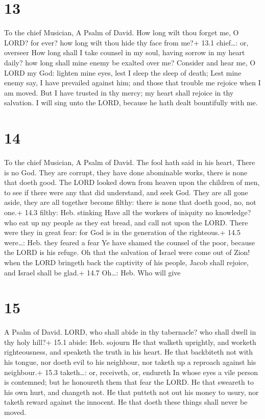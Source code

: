\hypertarget{section-12}{%
\section{13}\label{section-12}}

To the chief Musician, A Psalm of David.  How long wilt thou
forget me, O LORD? for ever? how long wilt thou hide thy face from me?+
13.1 chief\ldots: or, overseer  How long shall I take
counsel in my soul, having sorrow in my heart daily? how long shall mine
enemy be exalted over me?  Consider and hear me, O LORD my
God: lighten mine eyes, lest I sleep the sleep of death; 
Lest mine enemy say, I have prevailed against him; and those that
trouble me rejoice when I am moved.  But I have trusted in
thy mercy; my heart shall rejoice in thy salvation.  I will
sing unto the LORD, because he hath dealt bountifully with me.

\hypertarget{section-13}{%
\section{14}\label{section-13}}

To the chief Musician, A Psalm of David.  The fool hath said
in his heart, There is no God. They are corrupt, they have done
abominable works, there is none that doeth good.  The LORD
looked down from heaven upon the children of men, to see if there were
any that did understand, and seek God.  They are all gone
aside, they are all together become filthy: there is none that doeth
good, no, not one.+ 14.3 filthy: Heb. stinking  Have all the
workers of iniquity no knowledge? who eat up my people as they eat
bread, and call not upon the LORD.  There were they in great
fear: for God is in the generation of the righteous.+ 14.5 were\ldots:
Heb. they feared a fear  Ye have shamed the counsel of the
poor, because the LORD is his refuge.  Oh that the salvation
of Israel were come out of Zion! when the LORD bringeth back the
captivity of his people, Jacob shall rejoice, and Israel shall be glad.+
14.7 Oh\ldots: Heb. Who will give

\hypertarget{section-14}{%
\section{15}\label{section-14}}

A Psalm of David.  LORD, who shall abide in thy tabernacle?
who shall dwell in thy holy hill?+ 15.1 abide: Heb. sojourn 
He that walketh uprightly, and worketh righteousness, and speaketh the
truth in his heart.  He that backbiteth not with his tongue,
nor doeth evil to his neighbour, nor taketh up a reproach against his
neighbour.+ 15.3 taketh\ldots: or, receiveth, or, endureth 
In whose eyes a vile person is contemned; but he honoureth them that
fear the LORD. He that sweareth to his own hurt, and changeth not.
 He that putteth not out his money to usury, nor taketh
reward against the innocent. He that doeth these things shall never be
moved.

